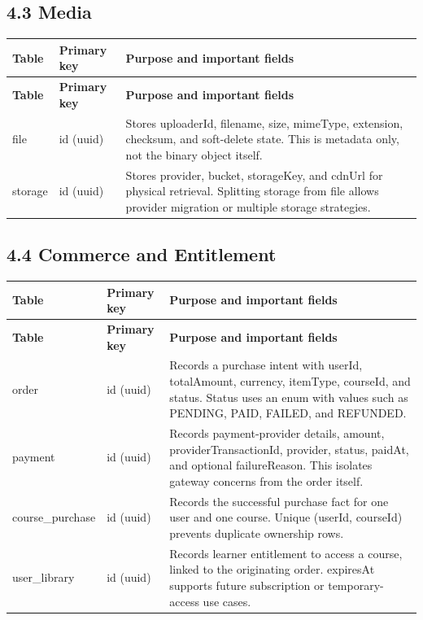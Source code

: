 \documentclass[11pt,a4paper]{article}
\begin{document}
\subsection*{4.3 Media}
\begin{longtable}{L{2.6cm}L{3.0cm}L{9.0cm}}
\toprule
\textbf{Table} & \textbf{Primary key} & \textbf{Purpose and important fields} \\
\midrule
\endfirsthead
\toprule
\textbf{Table} & \textbf{Primary key} & \textbf{Purpose and important fields} \\
\midrule
\endhead
\bottomrule
\endfoot
file & id (uuid) & Stores uploaderId, filename, size, mimeType, extension, checksum, and soft-delete state. This is metadata only, not the binary object itself. \\
storage & id (uuid) & Stores provider, bucket, storageKey, and cdnUrl for physical retrieval. Splitting storage from file allows provider migration or multiple storage strategies. \\
\end{longtable}

\subsection*{4.4 Commerce and Entitlement}
\begin{longtable}{L{2.6cm}L{3.0cm}L{9.0cm}}
\toprule
\textbf{Table} & \textbf{Primary key} & \textbf{Purpose and important fields} \\
\midrule
\endfirsthead
\toprule
\textbf{Table} & \textbf{Primary key} & \textbf{Purpose and important fields} \\
\midrule
\endhead
\bottomrule
\endfoot
order & id (uuid) & Records a purchase intent with userId, totalAmount, currency, itemType, courseId, and status. Status uses an enum with values such as PENDING, PAID, FAILED, and REFUNDED. \\
payment & id (uuid) & Records payment-provider details, amount, providerTransactionId, provider, status, paidAt, and optional failureReason. This isolates gateway concerns from the order itself. \\
course\_purchase & id (uuid) & Records the successful purchase fact for one user and one course. Unique (userId, courseId) prevents duplicate ownership rows. \\
user\_library & id (uuid) & Records learner entitlement to access a course, linked to the originating order. expiresAt supports future subscription or temporary-access use cases. \\
\end{longtable}
\end{document}
